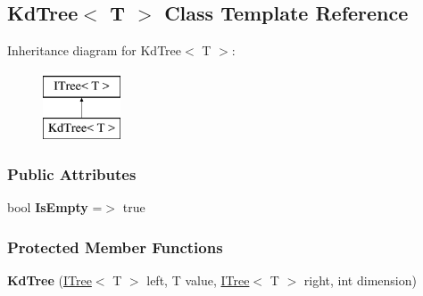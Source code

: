 \hypertarget{classTree_1_1KdTree}{}\subsection{Kd\+Tree$<$ T $>$ Class Template Reference}
\label{classTree_1_1KdTree}
Inheritance diagram for Kd\+Tree$<$ T $>$\+:\begin{figure}[H]
\begin{center}
\leavevmode
\includegraphics[height=2.000000cm]{classTree_1_1KdTree}
\end{center}
\end{figure}
\subsubsection*{Public Attributes}
\begin{DoxyCompactItemize}
\item 
\mbox{\label{classTree_1_1KdTree_aaaa6c7dd3bd14dc2ce7f0780de528bb1}} 
bool {\bfseries Is\+Empty} =$>$ true
\end{DoxyCompactItemize}
\subsubsection*{Protected Member Functions}
\begin{DoxyCompactItemize}
\item 
\mbox{\label{classTree_1_1KdTree_a37d04aebfbb87df89283087fff07f7df}} 
{\bfseries Kd\+Tree} (\hyperlink{interfaceTree_1_1ITree}{I\+Tree}$<$ T $>$ left, T value, \hyperlink{interfaceTree_1_1ITree}{I\+Tree}$<$ T $>$ right, int dimension)
\end{DoxyCompactItemize}

